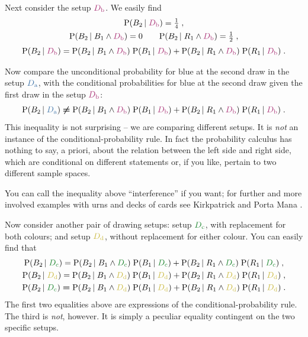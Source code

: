 \documentclass[\ifafour a4paper,12pt,\else a5paper,10pt,\fi%
onecolumn,oneside,article,%
british%
]{memoir}
\theoremstyle{remark}
\theoremstyle{innote}
\newcommand*{\citey}{\parencites*}
\newcommand*{\p}{\mathrm{P}}%
\renewcommand*{\|}[1][]{\nonscript\,#1\vert\nonscript\;\mathopen{}}
\newcommand*{\sect}{\S}%
\newcommand*{\yDa}{\textcolor{mypurpleblue}{D_{\textrm{a}}}}
\newcommand*{\yDb}{\textcolor{myredpurple}{D_{\textrm{b}}}}
\newcommand*{\yDc}{\textcolor{mygreen}{D_{\textrm{c}}}}
\newcommand*{\yDd}{\textcolor{myyellow}{D_{\textrm{d}}}}
\begin{document}
\medskip

Next consider the setup $\yDb$. We easily find
\begin{gather}
  \label{eq:B_red2}
  \p(B_{2} \| \yDb) = \tfrac{1}{4} \;,
  \\
  \label{eq:B_red2cond}
  \p(B_{2} \| B_{1} \land \yDb) = 0 \qquad
  \p(B_{2} \| R_{1} \land \yDb) = \tfrac{1}{2} \;,
  \\[\jot]
  \label{eq:B_rule}
  \p(B_{2} \| \yDb) =%
  \p(B_{2} \| B_{1} \land \yDb) \; \p( B_{1} \| \yDb) +
  \p(B_{2} \| R_{1} \land \yDb)  \; \p( R_{1} \| \yDb) \;.
\end{gather}


\medskip

Now compare the unconditional probability for blue at the second draw in
the setup $\yDa$, with the conditional probabilities for blue at the second
draw given the first draw in the setup $\yDb$:
\begin{equation}
  \label{eq:cross_combine}
  \p(B_{2} \| \yDa) \mathrel{\bm{\ne}}
  \p(B_{2} \| B_{1} \land \yDb) \; \p( B_{1} \| \yDb) +
  \p(B_{2} \| R_{1} \land \yDb)  \; \p( R_{1} \| \yDb) \;.
\end{equation}
This inequality is not surprising -- we are comparing different setups. It
is \emph{not} an instance of the conditional-probability rule. In fact the
probability calculus has nothing to say, a priori, about the relation
between the left side and right side, which are conditional on different
statements or, if you like, pertain to two different sample spaces.

You can call the inequality above \enquote{interference} if you want; for
further and more involved examples with urns and decks of cards see
Kirkpatrick \citey{kirkpatrick2001_r2003,kirkpatrick2002_r2003} and Porta
Mana \citey[\sect~IV]{portamana2003_r2004}.

\medskip

Now consider another pair of drawing setups: setup $\yDc$, with replacement
for both colours; and setup $\yDd$, without replacement for either colour.
You can easily find that
\begin{gather}
  \p(B_{2} \| \yDc) =%
  \p(B_{2} \| B_{1} \land \yDc) \; \p( B_{1} \| \yDc) +
  \p(B_{2} \| R_{1} \land \yDc)  \; \p( R_{1} \| \yDc) \;,
  \\
  \p(B_{2} \| \yDd) =%
  \p(B_{2} \| B_{1} \land \yDd) \; \p( B_{1} \| \yDd) +
  \p(B_{2} \| R_{1} \land \yDd)  \; \p( R_{1} \| \yDd) \;,
  \\
  \label{eq:cross_combine_same}
  \p(B_{2} \| \yDc) \mathrel{\bm{=}}
  \p(B_{2} \| B_{1} \land \yDd) \; \p( B_{1} \| \yDd) +
  \p(B_{2} \| R_{1} \land \yDd)  \; \p( R_{1} \| \yDd) \;.
\end{gather}
The first two equalities above are expressions of the
conditional-probability rule. The third is \emph{not}, however. It is
simply a peculiar equality contingent on the two specific setups.
\end{document}
